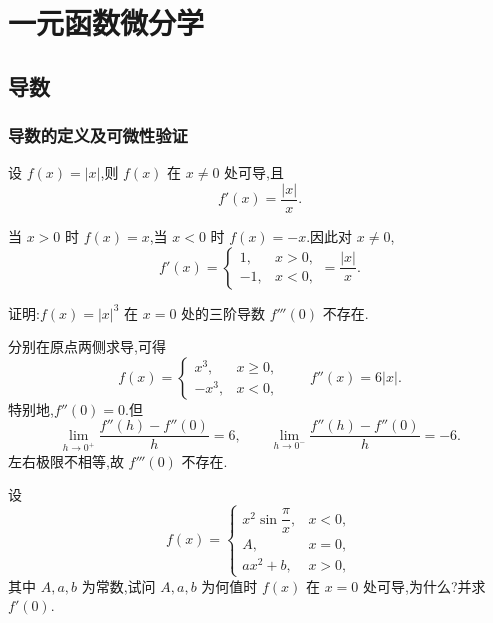 \setcounter{chapter}{3}
\pagestyle{fancy}

\chapter{一元函数微分学}


\section{导数}


\subsection{导数的定义及可微性验证}

\begin{example}
    设 $f(x)=|x|$,则 $f(x)$ 在 $x\neq0$ 处可导,且
    \[
        f'(x)=\dfrac{|x|}{x}.
    \]
\end{example}
\exampleblank

\begin{solution}
    当 $x>0$ 时 $f(x)=x$,当 $x<0$ 时 $f(x)=-x$.因此对 $x\neq0$,
    \[
        f'(x)=
        \begin{cases}
            1,  & x>0, \\
            -1, & x<0,
        \end{cases}
        =\dfrac{|x|}{x}.
    \]
\end{solution}

\begin{example}
    证明:$f(x)=|x|^3$ 在 $x=0$ 处的三阶导数 $f'''(0)$ 不存在.
\end{example}
\exampleblank

\begin{solution}
    分别在原点两侧求导,可得
    \[
        f(x)=
        \begin{cases}
            x^3,  & x\geq0, \\
            -x^3, & x<0,
        \end{cases}
        \qquad
        f''(x)=6|x|.
    \]
    特别地,$f''(0)=0$.但
    \[
        \lim\limits_{h\to0^+}\dfrac{f''(h)-f''(0)}{h}=6,
        \qquad
        \lim\limits_{h\to0^-}\dfrac{f''(h)-f''(0)}{h}=-6.
    \]
    左右极限不相等,故 $f'''(0)$ 不存在.
\end{solution}

\begin{example}
    设
    \[
        f(x)=
        \begin{cases}
            x^2\sin\dfrac{\pi}{x}, & x<0, \\
            A,                     & x=0, \\
            ax^2+b,                & x>0,
        \end{cases}
    \]
    其中 $A,a,b$ 为常数,试问 $A,a,b$ 为何值时 $f(x)$ 在 $x=0$ 处可导,为什么?并求 $f'(0)$.
\end{example}
\exampleblank

